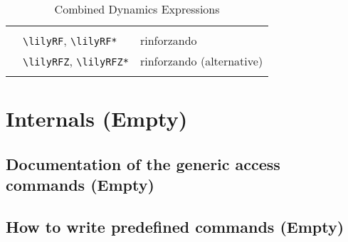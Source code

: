 \documentclass{article}
\newcommand*{\cmd}[1]{\texttt{\textbackslash #1}}
\newcommand{\tmpCaption}{} %
\newcommand{\tmpLabel}{}
\newenvironment{reftable}[2]
	{%
		\renewcommand{\tmpCaption}{#1}
		\renewcommand{\tmpLabel}{#2}
		\begin{table}[ht]
		\begin{center}
		\begin{tabular}[t]{lll}
		\hline
		&\\
	}
	{%
		&\\
		\hline
		\end{tabular}
		\caption{\tmpCaption}
		\label{table:\tmpLabel}
		\end{center}
		\end{table}
	}
\begin{document}
\begin{reftable}{Combined Dynamics Expressions}{combinedDynLetters}
\lilyRF* & \cmd{lilyRF}, \cmd{lilyRF*} & rinforzando\\
\lilyRFZ* & \cmd{lilyRFZ}, \cmd{lilyRFZ*} & rinforzando (alternative)\\

\end{reftable}

\section{Internals (Empty)}

\subsection{Documentation of the generic access commands (Empty)}

\subsection{How to write predefined commands (Empty)}
\end{document}
